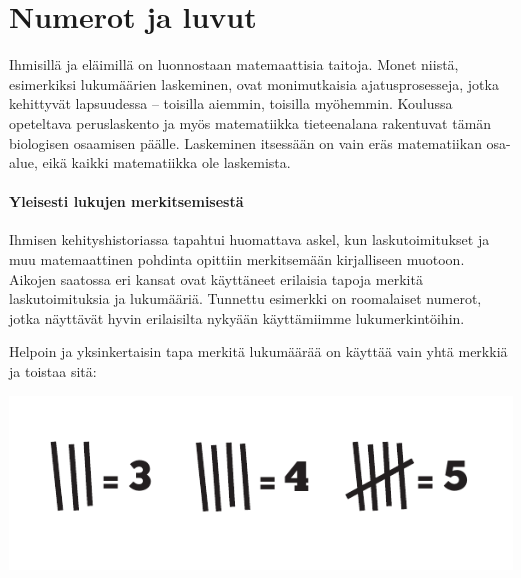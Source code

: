\chapter{Numerot ja luvut}

Ihmisillä ja eläimillä on luonnostaan matemaattisia taitoja. Monet niistä, esimerkiksi lukumäärien laskeminen, ovat monimutkaisia ajatusprosesseja, jotka kehittyvät lapsuudessa – toisilla aiemmin, toisilla myöhemmin. Koulussa opeteltava peruslaskento ja myös matematiikka tieteenalana rakentuvat tämän biologisen osaamisen päälle. Laskeminen itsessään on vain eräs matematiikan osa-alue, eikä kaikki matematiikka ole laskemista.


\subsubsection*{Yleisesti lukujen merkitsemisestä}

Ihmisen kehityshistoriassa tapahtui huomattava askel, kun laskutoimitukset ja muu matemaattinen pohdinta opittiin merkitsemään kirjalliseen muotoon. Aikojen saatossa eri kansat ovat käyttäneet erilaisia tapoja merkitä laskutoimituksia ja lukumääriä. Tunnettu esimerkki on roomalaiset numerot, jotka näyttävät hyvin erilaisilta nykyään käyttämiimme lukumerkintöihin.

Helpoin ja yksinkertaisin tapa merkitä lukumäärää on käyttää vain yhtä merkkiä ja toistaa sitä:


\begin{center}
\includegraphics{01-luvut/kuvia/Kuva1-1-tukkimiehenkirjanpito.pdf}
\end{center}

